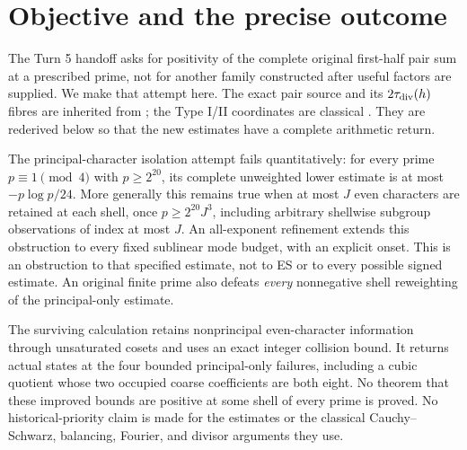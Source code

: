 \section{Objective and the precise outcome}
The Turn 5 handoff asks for positivity of the complete original first-half
pair sum at a prescribed prime, not for another family constructed after useful
factors are supplied. We make that attempt here. The exact pair source and its
$2\tau_{\rm div}(h)$ fibres are inherited from \cite[\S\S3--4]{Turn5}; the
Type I/II coordinates are classical \cite[\S2]{ET}. They are rederived below so
that the new estimates have a complete arithmetic return.

The principal-character isolation attempt fails quantitatively: for every prime
$p\equiv1\pmod4$ with $p\ge2^{20}$, its complete unweighted lower estimate is at
most $-p\log p/24$. More generally this remains true when at most $J$ even characters are retained
at each shell, once $p\ge2^{20}J^3$, including arbitrary shellwise subgroup
observations of index at most $J$. An all-exponent refinement extends this
obstruction to every fixed sublinear mode budget, with an explicit onset.
This is an obstruction to that specified estimate, not to ES or to every possible
signed estimate. An original finite prime also defeats \emph{every} nonnegative
shell reweighting of the principal-only estimate.

The surviving calculation retains nonprincipal even-character information
through unsaturated cosets and uses an exact integer collision bound. It returns
actual states at the four bounded principal-only failures, including a cubic
quotient whose two occupied coarse coefficients are both eight. No theorem
that these improved bounds are positive at some shell of every prime is proved.
No historical-priority claim is made for the estimates or the classical
Cauchy--Schwarz, balancing, Fourier, and divisor arguments they use.

